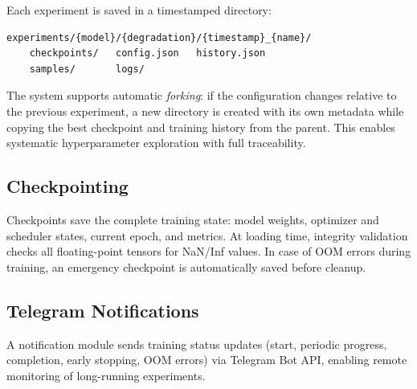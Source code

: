 Each experiment is saved in a timestamped directory:
\begin{small}
\begin{verbatim}
experiments/{model}/{degradation}/{timestamp}_{name}/
    checkpoints/   config.json   history.json
    samples/       logs/
\end{verbatim}
\end{small}

The system supports automatic \textit{forking}: if the configuration changes relative to the previous experiment, a new directory is created with its own metadata while copying the best checkpoint and training history from the parent. This enables systematic hyperparameter exploration with full traceability.

\subsection{Checkpointing}

Checkpoints save the complete training state: model weights, optimizer and scheduler states, current epoch, and metrics. At loading time, integrity validation checks all floating-point tensors for NaN/Inf values. In case of OOM errors during training, an emergency checkpoint is automatically saved before cleanup.

\subsection{Telegram Notifications}

A notification module sends training status updates (start, periodic progress, completion, early stopping, OOM errors) via Telegram Bot API, enabling remote monitoring of long-running experiments.
